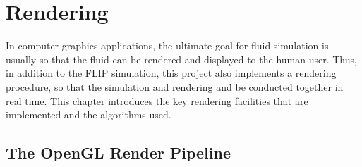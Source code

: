 \chapter{Rendering}
\label{chapter render}
In computer graphics applications, the ultimate goal for fluid simulation is usually so that the fluid can be rendered and displayed to the human user. Thus, in addition to the FLIP simulation, this project also implements a rendering procedure, so that the simulation and rendering and be conducted together in real time. This chapter introduces the key rendering facilities that are implemented and the algorithms used.


\section{The OpenGL Render Pipeline}
\label{section opengl}

